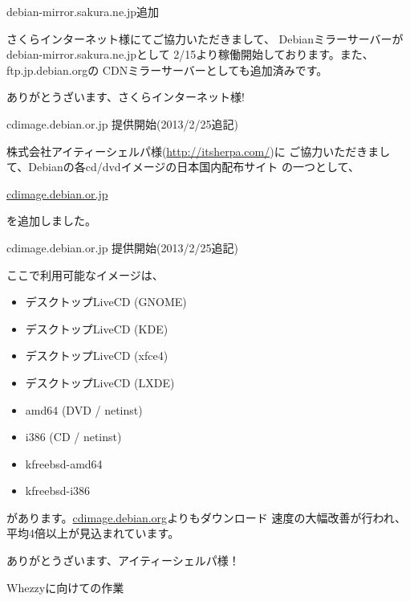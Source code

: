 \begin{frame}{debian-mirror.sakura.ne.jp追加}

 さくらインターネット様にてご協力いただきまして、
Debianミラーサーバーがdebian-mirror.sakura.ne.jpとして
2/15より稼働開始しております。また、ftp.jp.debian.orgの
CDNミラーサーバーとしても追加済みです。

\begin{center}
\LARGE
ありがとうざいます、さくらインターネット様!
\end{center}

\end{frame}

\begin{frame}{cdimage.debian.or.jp 提供開始(2013/2/25追記)}

\Large
 株式会社アイティーシェルパ様(\url{http://itsherpa.com/})に
ご協力いただきまして、Debianの各cd/dvdイメージの日本国内配布サイト
の一つとして、
\begin{center}
\url{cdimage.debian.or.jp}
\end{center}
を追加しました。
\end{frame}

\begin{frame}{cdimage.debian.or.jp 提供開始(2013/2/25追記)}

ここで利用可能なイメージは、
\begin{itemize}
\item デスクトップLiveCD (GNOME)
\item デスクトップLiveCD (KDE)
\item デスクトップLiveCD (xfce4)
\item デスクトップLiveCD (LXDE)
\item amd64 (DVD / netinst)
\item i386 (CD / netinst)
\item kfreebsd-amd64
\item kfreebsd-i386
\end{itemize}
があります。\url{cdimage.debian.org}よりもダウンロード
速度の大幅改善が行われ、平均4倍以上が見込まれています。

\begin{center}
\LARGE
ありがとうざいます、アイティーシェルパ様！
\end{center}
\end{frame}

\begin{frame}
\begin{center}
\LARGE{Whezzyに向けての作業}
\end{center}
\end{frame}

